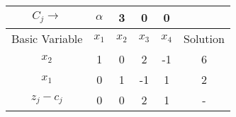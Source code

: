 \begin{tabular}{|c|c|c|c|c|c|}
    \hline
    $C_j \rightarrow$ & $\alpha$ & 3 & 0 & 0 & \\ \hline
    Basic Variable & $x_1$ & $x_2$ & $x_3$ & $x_4$ & Solution \\ \hline
    $x_2$ & 1 & 0 & 2 & -1 & 6 \\ \hline
    $x_1$ & 0 & 1 & -1 & 1 & 2 \\ \hline
    $z_j - c_j$ & 0 & 0 & 2 & 1 & - \\ \hline
\end{tabular}